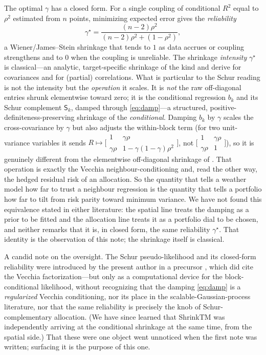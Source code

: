 \documentclass[11pt]{article}
\newcommand{\gstar}{\gamma^\star}
\newcommand{\Sc}{\mathsf S}
\begin{document}
The optimal $\gamma$ has a closed form. For a single coupling of conditional $R^2$ equal to $\rho^2$
estimated from $n$ points, minimizing expected error gives the \emph{reliability}
\begin{equation}\label{eq:gstar}
  \gstar=\frac{(n-2)\rho^2}{(n-2)\rho^2+(1-\rho^2)},
\end{equation}
a Wiener/James--Stein shrinkage \citep{james1961,ledoit2012} that tends to $1$ as data accrues or
coupling strengthens and to $0$ when the coupling is unreliable. The shrinkage \emph{intensity}
$\gstar$ is classical---an analytic, target-specific shrinkage of the kind \citet{ledoit2004} and
\citet{schafer2005} derive for covariances and for (partial) correlations. What is particular to the
Schur reading is not the intensity but the \emph{operation} it scales. It is \emph{not} the raw
off-diagonal entries shrunk elementwise toward zero; it is the conditional regression $b_k$ and its
Schur complement $\Sc_k$, damped through \eqref{eq:damp}---a structured, positive-definiteness-preserving
shrinkage of the \emph{conditional}. Damping $b_k$ by $\gamma$ scales the cross-covariance by $\gamma$
but also adjusts the within-block term (for two unit-variance variables it sends
$R\mapsto\bigl[\begin{smallmatrix}1&\gamma\rho\\\gamma\rho&1-\gamma(1-\gamma)\rho^2\end{smallmatrix}\bigr]$,
not $\bigl[\begin{smallmatrix}1&\gamma\rho\\\gamma\rho&1\end{smallmatrix}\bigr]$), so it is genuinely
different from the elementwise off-diagonal shrinkage of \citet{schafer2005}. That operation is exactly
the Vecchia neighbour-conditioning and, read the other way, the hedged residual risk of an allocation.
So the quantity that tells a
weather model how far to trust a neighbour regression is the quantity that tells a portfolio how far to
tilt from risk parity toward minimum variance. We have not found this equivalence stated in either
literature: the spatial line treats the damping as a prior to be fitted and the allocation line treats
it as a portfolio dial to be chosen, and neither remarks that it is, in closed form, the same
reliability $\gstar$. That identity is the observation of this note; the shrinkage itself is classical.

A candid note on the oversight. The Schur pseudo-likelihood and its closed-form reliability were
introduced by the present author in a precursor \citep{cotton2025psl}, which did cite the Vecchia
factorization---but only as a computational device for the block-conditional likelihood, without
recognizing that the damping \eqref{eq:damp} is a \emph{regularized} Vecchia conditioning, nor its place
in the scalable-Gaussian-process literature, nor that the same reliability is precisely the knob of
Schur-complementary allocation. (We have since learned that ShrinkTM \citep{chakraborty2025} was
independently arriving at the conditional shrinkage at the same time, from the spatial side.) That these
were one object went unnoticed when the first note was written; surfacing it is the purpose of this one.
\end{document}
